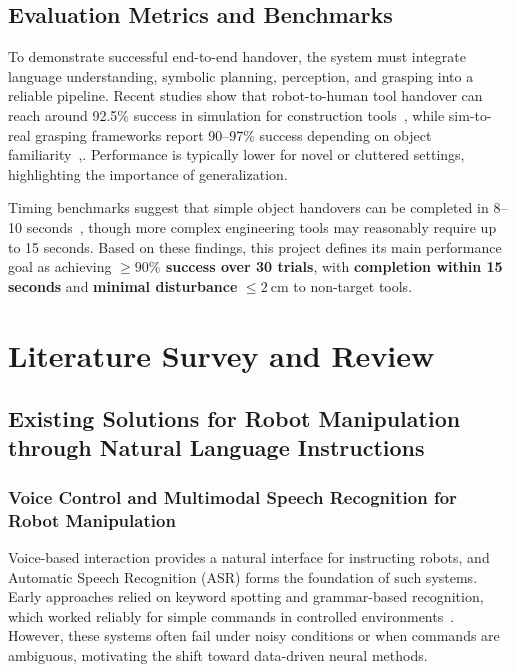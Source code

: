 \documentclass[12pt]{extarticle}
\begin{document}
\begin{enumerate}
\subsection*{Evaluation Metrics and Benchmarks}

To demonstrate successful end-to-end handover, the system must integrate language understanding, symbolic planning, perception, and grasping into a reliable pipeline. Recent studies show that robot-to-human tool handover can reach around 92.5\% success in simulation for construction tools~\cite{iaarc2025_handover}, while sim-to-real grasping frameworks report 90--97\% success depending on object familiarity~\cite{mogpe2022},\cite{grasping2023}. Performance is typically lower for novel or cluttered settings, highlighting the importance of generalization.  

Timing benchmarks suggest that simple object handovers can be completed in 8--10 seconds~\cite{handover2024_fast}, though more complex engineering tools may reasonably require up to 15 seconds. Based on these findings, this project defines its main performance goal as achieving \textbf{$\geq90\%$ success over 30 trials}, with \textbf{completion within 15 seconds} and \textbf{minimal disturbance} $\leq\SI{2}{\centi\meter}$ to non-target tools.


\end{enumerate}

\newpage
\section{Literature Survey and Review}

\subsection{Existing Solutions for Robot Manipulation through Natural Language Instructions}

\subsubsection{Voice Control and Multimodal Speech Recognition for Robot Manipulation}

Voice-based interaction provides a natural interface for instructing robots, and Automatic Speech Recognition (ASR) forms the foundation of such systems. Early approaches relied on keyword spotting and grammar-based recognition, which worked reliably for simple commands in controlled environments~\cite{smith2015voice}. However, these systems often fail under noisy conditions or when commands are ambiguous, motivating the shift toward data-driven neural methods.
\end{document}
